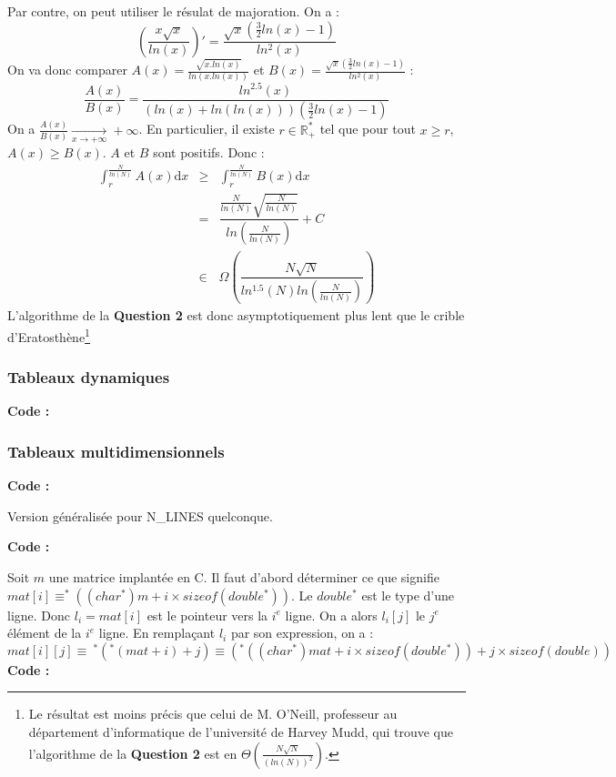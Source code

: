 \documentclass[../main.tex]{subfiles}
\begin{document}
Par contre, on peut utiliser le résulat de majoration. On a :
$$
\left(\frac{x\sqrt{x}}{ln(x)}\right)' = \frac{\sqrt{x}(\frac{3}{2}ln(x) - 1)}{ln^2(x)}
$$
On va donc comparer $A(x) = \frac{\sqrt{x.ln(x)}}{ln(x.ln(x))}$ et $B(x) = \frac{\sqrt{x}(\frac{3}{2}ln(x) - 1)}{ln^2(x)}$ :
$$\dfrac{A(x)}{B(x)} = \dfrac{ln^{2.5}(x)}{(ln(x) + ln(ln(x)))(\frac{3}{2}ln(x) - 1)}$$
On a $\frac{A(x)}{B(x)}\underset{x\rightarrow +\infty}{\rightarrow}+\infty$. En particulier, il existe $r\in\mathbb{R}_+^*$ tel que pour tout $x\geq r$, $A(x) \geq B(x)$. $A$ et $B$ sont positifs. Donc :
$$\begin{array}{lcl}
\displaystyle\int_r^{\frac{N}{ln(N)}}A(x)\mathrm{d}x & \geq & \displaystyle\int_r^{\frac{N}{ln(N)}}B(x)\mathrm{d}x \\
& = & \dfrac{\frac{N}{ln(N)}\sqrt{\frac{N}{ln(N)}}}{ln\left(\frac{N}{ln(N)}\right)} + C \\
& \in & \Omega\left(\dfrac{N\sqrt{N}}{ln^{1.5}(N)ln(\frac{N}{ln(N)})}\right)
\end{array}
$$
L'algorithme de la \textbf{Question 2} est donc asymptotiquement plus lent que le crible d'Eratosthène\footnote{Le résultat est moins précis que celui de M. O'Neill, professeur au département d'informatique de l'université de Harvey Mudd, qui trouve que l'algorithme de la \textbf{Question 2} est en $\Theta\left(\frac{N\sqrt{N}}{(ln(N))^2}\right)$.}
\subsubsection{Tableaux dynamiques}

\textbf{Code :} 
\subsubsection{Tableaux multidimensionnels}

\textbf{Code :} 

\newline
Version généralisée pour \textsf{N\_LINES} quelconque.

\textbf{Code :} 

 \newline
Soit $m$ une matrice implantée en C. Il faut d'abord déterminer ce que signifie $mat[i] \equiv ^*((char^*)m + i\times sizeof(double^*))$. Le $double^*$ est le type d'une ligne. Donc $l_{i} = mat[i]$ est le pointeur vers la $i^{e}$ ligne. On a alors $l_{i}[j]$ le $j^e$ élément de la $i^e$ ligne. En remplaçant $l_{i}$ par son expression, on a :
$$mat[i][j] \equiv\ ^*(^*(mat + i) + j) \equiv (^*((char^*)mat + i\times sizeof(double^*)) + j\times sizeof(double)) $$
\textbf{Code :} 
\end{document}
